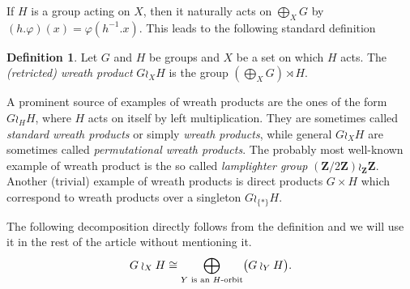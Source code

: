 \documentclass[a4paper]{article}
\theoremstyle{definition}
\newtheorem{defn}[lem]{Definition}
\newcommand*{\field}[1]{\mathbf{#1}}
\newcommand*{\Z}{\field{Z}}
\begin{document}
If $H$ is a group acting on $X$, then it naturally acts on $\bigoplus_XG$
by $(h.\varphi)(x)=\varphi(h^{-1}.x)$.
This leads to the following standard definition
\begin{defn}\label{Def:WreathProd}
Let $G$ and $H$ be groups and $X$ be a set on which $H$ acts.
The \emph{(retricted) wreath product} $G\wr_XH$ is the group $(\bigoplus_XG)\rtimes H$.
\end{defn}
A prominent  source of examples of wreath products are the ones of the form $G\wr_HH$, where $H$ acts on itself by left multiplication.
They are sometimes called \emph{standard wreath products} or simply \emph{wreath products}, while general $G\wr_XH$ are sometimes called \emph{permutational wreath products}.
The probably most well-known example of wreath product is the so called \emph{lamplighter group} $(\Z/2\Z)\wr_\Z\Z$.
Another (trivial) example of wreath products is direct products $G\times H$ which correspond to wreath products over a singleton $G\wr_{\{*\}}H$.

The following decomposition directly follows from the definition and we will use it in the rest of the article without mentioning it.
\[
	G\wr_XH\cong\bigoplus_{Y\textnormal{ is an $H$-orbit}}\bigl(G\wr_YH\bigr).
\]
%
%
%
%
%
%
%
%
%
%
\end{document}
